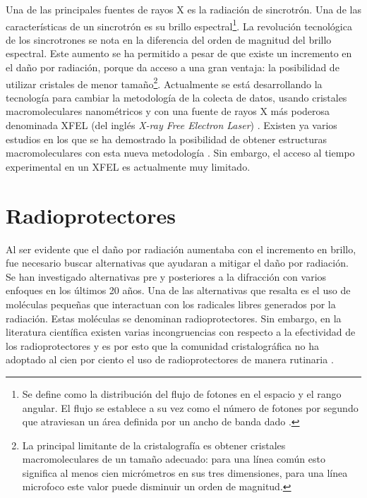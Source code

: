 Una de las principales fuentes de rayos X es la radiación de sincrotrón. Una de las características de un sincrotrón es su brillo espectral\footnote{Se define como la distribución del flujo de fotones en el espacio y el rango angular. El flujo se establece a su vez como el número de fotones por segundo que atraviesan un área definida por un ancho de banda dado \cite{Willmott2019}.}. La revolución tecnológica de los sincrotrones se nota en la diferencia del orden de magnitud del brillo espectral. Este aumento se ha permitido a pesar de que existe un incremento en el daño por radiación, porque da acceso a una gran ventaja: la posibilidad de utilizar cristales de menor tamaño\footnote{La principal limitante de la cristalografía es obtener cristales macromoleculares de un tamaño adecuado: para una línea común esto significa al menos cien micrómetros en sus tres dimensiones, para una línea microfoco este valor puede disminuir un orden de magnitud.}.  Actualmente se está desarrollando la tecnología para cambiar la metodología de la colecta de datos, usando cristales macromoleculares nanométricos y con una fuente de rayos X más poderosa denominada XFEL (del inglés \emph{X-ray Free Electron Laser}) \cite{Martin-Garcia2016}. Existen ya varios estudios en los que se ha demostrado la posibilidad de obtener estructuras macromoleculares con esta nueva metodología \cite{Martin-Garcia2016}. Sin embargo, el acceso al tiempo experimental en un XFEL es actualmente muy limitado.

\section{Radioprotectores}
Al ser evidente que el daño por radiación aumentaba con el incremento en brillo, fue necesario buscar alternativas que ayudaran a mitigar el daño por radiación. Se han investigado alternativas pre y posteriores a la difracción con varios enfoques en los últimos 20 años\cite{Garman2017}. Una de las alternativas que resalta es el uso de moléculas pequeñas que interactuan con los radicales libres generados por la radiación. Estas moléculas se denominan radioprotectores.  Sin embargo, en la literatura científica existen varias incongruencias con respecto a la efectividad de los radioprotectores y es por esto que la comunidad cristalográfica no ha adoptado al cien por ciento el uso de radioprotectores de manera rutinaria \cite{Nowak2009, Allan2013}.
